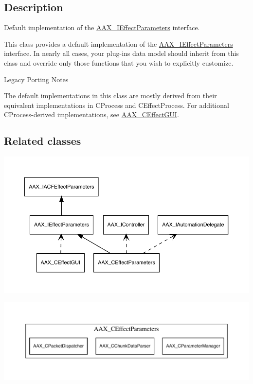 \subsection{Description}
Default implementation of the \mbox{\hyperlink{a01825}{A\+A\+X\+\_\+\+I\+Effect\+Parameters}} interface. 

This class provides a default implementation of the \mbox{\hyperlink{a01825}{A\+A\+X\+\_\+\+I\+Effect\+Parameters}} interface. In nearly all cases, your plug-\/in\textquotesingle{}s data model should inherit from this class and override only those functions that you wish to explicitly customize.

\begin{DoxyRefDesc}{Legacy Porting Notes}
\item[\mbox{\hyperlink{a00787__porting_notes000006}{Legacy Porting Notes}}]The default implementations in this class are mostly derived from their equivalent implementations in C\+Process and C\+Effect\+Process. For additional C\+Process-\/derived implementations, see \mbox{\hyperlink{a01477}{A\+A\+X\+\_\+\+C\+Effect\+G\+UI}}.\end{DoxyRefDesc}
\hypertarget{a01481_AAX_CEffectParameters_relclass}{}\subsection{Related classes}\label{a01481_AAX_CEffectParameters_relclass}

\begin{DoxyImage}
\includegraphics[width=\textwidth,height=\textheight/2,keepaspectratio=true]{dot_aax_ieffectparams_related}
\end{DoxyImage}
 
\begin{DoxyImage}
\includegraphics[width=\textwidth,height=\textheight/2,keepaspectratio=true]{dot_aax_ieffectparams_contained}
\end{DoxyImage}
